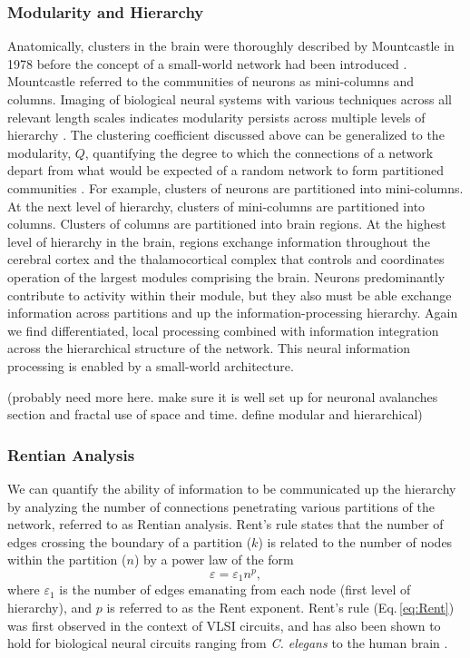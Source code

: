 \documentclass[twocolumn]{article}
\begin{document}
\subsubsection{\label{sec:modularity_and_hierarchy}Modularity and Hierarchy}
Anatomically, clusters in the brain were thoroughly described by Mountcastle in 1978 \cite{mo1978} before the concept of a small-world network had been introduced \cite{wast1998}. Mountcastle referred to the communities of neurons as mini-columns and columns. Imaging of biological neural systems with various techniques across all relevant length scales indicates modularity persists across multiple levels of hierarchy \cite{beba2017}. The clustering coefficient discussed above can be generalized to the modularity, $Q$, quantifying the degree to which the connections of a network depart from what would be expected of a random network to form partitioned communities \cite{rusp2010,beba2017}. For example, clusters of neurons are partitioned into mini-columns. At the next level of hierarchy, clusters of mini-columns are partitioned into columns. Clusters of columns are partitioned into brain regions. At the highest level of hierarchy in the brain, regions exchange information throughout the cerebral cortex and the thalamocortical complex that controls and coordinates operation of the largest modules comprising the brain. Neurons predominantly contribute to activity within their module, but they also must be able exchange information across partitions and up the information-processing hierarchy. Again we find differentiated, local processing combined with information integration across the hierarchical structure of the network. This neural information processing is enabled by a small-world architecture.

(probably need more here. make sure it is well set up for neuronal avalanches section and fractal use of space and time. define modular and hierarchical)

\subsubsection{Rentian Analysis}
We can quantify the ability of information to be communicated up the hierarchy by analyzing the number of connections penetrating various partitions of the network, referred to as Rentian analysis. Rent's rule states that the number of edges crossing the boundary of a partition ($k$) is related to the number of nodes within the partition ($n$) by a power law of the form
\begin{equation}
\label{eq:Rent}
\varepsilon = \varepsilon_1 n^p,
\end{equation}
where $\varepsilon_1$ is the number of edges emanating from each node (first level of hierarchy), and $p$ is referred to as the Rent exponent. Rent's rule (Eq.\,\ref{eq:Rent}) was first observed in the context of VLSI circuits, and has also been shown to hold for biological neural circuits ranging from \textit{C. elegans} to the human brain \cite{bagr2010}. 
\end{document}
